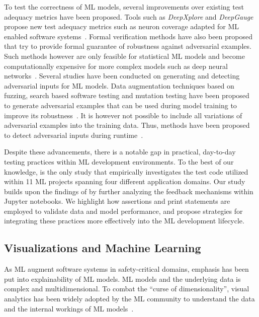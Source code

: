 \documentclass[journal]{IEEEtran}       %
\begin{document}
To test the correctness of ML models, several improvements over
existing test adequacy metrics have been proposed. Tools such as
\textit{DeepXplore} and \textit{DeepGauge} propose new test adequacy
metrics such as neuron coverage adapted for ML enabled software
systems~\cite{pei2017deepxplore,ma2018deepgauge,gerasimou2020importance-driven}.
Formal verification methods have also been proposed that try to
provide formal guarantee of robustness against adversarial examples.
Such methods however are only feasible for statistical ML models and
become computationally expensive for more complex models such as deep
neural networks~\cite{zhu2021deepmemory,baluta2021scalable}. Several
studies have been conducted on generating and detecting adversarial
inputs for ML models. Data augmentation techniques based on fuzzing,
search based software testing and mutation testing have been proposed
to generate adversarial examples that can be used during model
training to improve its
robustness~\cite{braiek2019deepevolution,gao2020fuzz,wang2021robot,zhang2020white-box}.
It is however not possible to include all variations of adversarial
examples into the training data. Thus, methods have been proposed to
detect adversarial inputs during
runtime~\cite{xiao2021self-checking,wang2020dissector,wang2019adversarial,berend2020cats}.

Despite these advancements, there is a notable gap in practical,
day-to-day testing practices within ML development environments. To
the best of our knowledge, \cite{openja_empirical_2024} is the only
study that empirically investigates the test code utilized within 11
ML projects spanning four different application domains. Our study
builds upon the findings of \cite{openja_empirical_2024} by further
analyzing the feedback mechanisms within Jupyter notebooks. We
highlight how assertions and print statements are employed to
validate data and model performance, and propose strategies for
integrating these practices more effectively into the ML development lifecycle.

\subsection{Visualizations and Machine Learning}\label{sec:visualizations}

As ML augment software systems in safety-critical domains, emphasis
has been put into explainability of ML models. ML models and the
underlying data is complex and multidimensional. To combat the
``curse of dimensionality'', visual analytics has been widely adopted
by the ML community to understand the data and the internal workings
of ML models~\cite{yuan2021survey,hohman2019visual,wexler2019what-if}.
\end{document}
